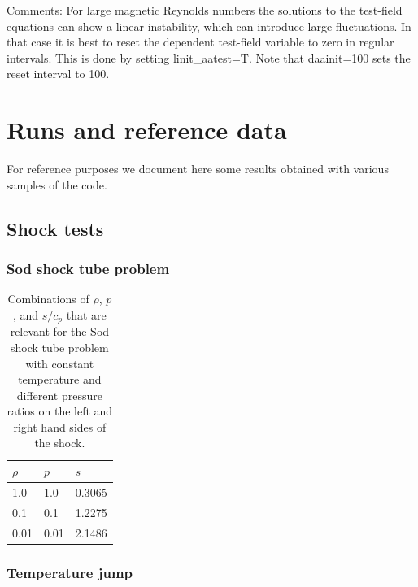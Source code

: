 \documentclass[\mydriver,12pt,twoside,notitlepage,a4paper]{article}
\begin{document}
Comments:
For large magnetic Reynolds numbers the solutions to the test-field equations
can show a linear instability, which can introduce large fluctuations.
In that case it is best to reset the dependent test-field variable to zero
in regular intervals.
This is done by setting linit\_aatest=T. Note that daainit=100 sets the
reset interval to 100.


\section{Runs and reference data}
\label{S-ref-data}

For reference purposes we document here some results obtained with various
samples of the code.


\subsection{Shock tests}

\subsubsection{Sod shock tube problem}

\begin{table}[htb]
  \begin{center}
    \caption{
        Combinations of $\rho$, $p$, and $s/c_p$ that are relevant
        for the Sod shock tube problem with constant temperature
        and different pressure ratios on the left and right hand
        sides of the shock.
    }
    \label{Tshock1}
    \begin{tabular}{lll}
    \toprule
$\rho$  &  $p$  &  $s$  \\
    \midrule
   1.0  &  1.0  &  0.3065  \\
   0.1  &  0.1  &  1.2275  \\
   0.01 &  0.01 &  2.1486  \\
    \bottomrule
    \end{tabular}
  \end{center}
\end{table}

\subsubsection{Temperature jump}
\end{document}

